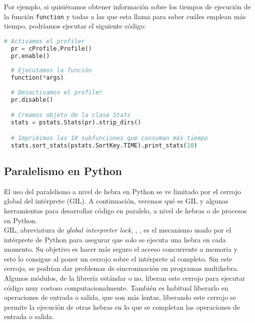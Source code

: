 \documentclass[12pt,a4paper]{report} %
\theoremstyle{definition}
\begin{document}
Por ejemplo, si quisiéramos obtener información sobre los tiempos de ejecución de la función \texttt{function} y todas a las que esta llama para saber cuáles emplean más tiempo, podríamos ejecutar el siguiente código:\\

\begin{lstlisting}[language=Python]
  # Activamos el profiler
  pr = cProfile.Profile()
  pr.enable()
  
  # Ejecutamos la función
  function(*args)
  
  # Desactivamos el profiler
  pr.disable()

  # Creamos objeto de la clase Stats
  stats = pstats.Stats(pr).strip_dirs()

  # Imprimimos las 10 subfunciones que consuman más tiempo
  stats.sort_stats(pstats.SortKey.TIME).print_stats(10)
\end{lstlisting}

\subsection{Paralelismo en Python}

El uso del paralelismo a nivel de hebra en Python se ve limitado por el cerrojo global del intérprete (GIL). A continuación, veremos qué es GIL y algunas herramientas para desarrollar código en paralelo, a nivel de hebras o de procesos en Python.\\

GIL, abreviatura de \textit{global interpreter lock}, \cite{glossary_GIL}, \cite{GIL}, es el mecanismo usado por el intérprete de Python para asegurar que solo  se ejecuta una hebra en cada momento. Su objetivo es hacer más seguro el acceso concurrente a memoria y esto lo consigue al poner un cerrojo sobre el intérprete al completo. Sin este cerrojo, se podrían dar problemas de sincronización en programas multihebra.\\

Algunos módulos, de la librería estándar o no, liberan este cerrojo para ejecutar código muy costoso computacionalmente. También es habitual liberarlo en operaciones de entrada o salida, que son más lentas, liberando este cerrojo se permite la ejecución de otras hebras  en lo que se completan las operaciones de entrada o salida.\\
\end{document}
